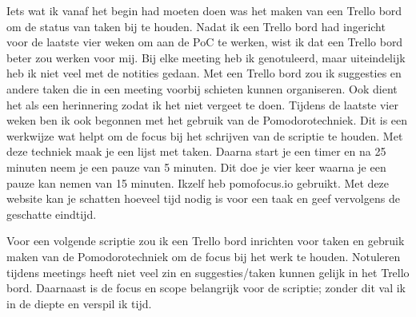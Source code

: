 Iets wat ik vanaf het begin had moeten doen was het maken van een Trello bord om de status van taken bij te houden. Nadat ik een Trello bord had ingericht voor de laatste vier weken om aan de PoC te werken, wist ik dat een Trello bord beter zou werken voor mij. Bij elke meeting heb ik genotuleerd, maar uiteindelijk heb ik niet veel met de notities gedaan. Met een Trello bord zou ik suggesties en andere taken die in een meeting voorbij schieten kunnen organiseren. Ook dient het als een herinnering zodat ik het niet vergeet te doen. Tijdens de laatste vier weken ben ik ook begonnen met het gebruik van de Pomodorotechniek. Dit is een werkwijze wat helpt om de focus bij het schrijven  van de scriptie te houden. Met deze techniek maak je een lijst met taken. Daarna start je een timer en na 25 minuten neem je een pauze van 5 minuten. Dit doe je vier keer waarna je een pauze kan nemen van 15 minuten. Ikzelf heb pomofocus.io gebruikt. Met deze website kan je schatten hoeveel tijd nodig is voor een taak en geef vervolgens de geschatte eindtijd.

Voor een volgende scriptie zou ik een Trello bord inrichten voor taken en gebruik maken van de Pomodorotechniek om de focus bij het werk te houden. Notuleren tijdens meetings heeft niet veel zin en suggesties/taken kunnen gelijk in het Trello bord. Daarnaast is de focus en scope belangrijk voor de scriptie; zonder dit val ik in de diepte en verspil ik tijd.







